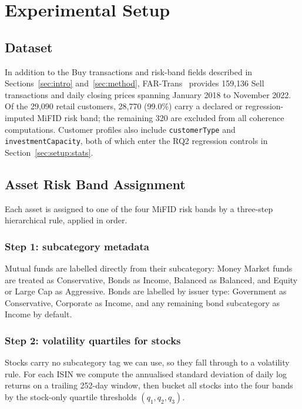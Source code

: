 \section{Experimental Setup}
\label{sec:setup}

\subsection{Dataset}
\label{sec:setup:dataset}

In addition to the Buy transactions and risk-band fields described in Sections~\ref{sec:intro} and~\ref{sec:method}, FAR-Trans~\cite{sanzcruzado:fartrans} provides 159{,}136 Sell transactions and daily closing prices spanning January 2018 to November 2022. Of the 29{,}090 retail customers, 28{,}770 (99.0\%) carry a declared or regression-imputed MiFID risk band; the remaining 320 are excluded from all coherence computations. Customer profiles also include \texttt{customerType} and \texttt{investmentCapacity}, both of which enter the RQ2 regression controls in Section~\ref{sec:setup:stats}.

\subsection{Asset Risk Band Assignment}
\label{sec:setup:bandassignment}

Each asset is assigned to one of the four MiFID risk bands by a three-step hierarchical rule, applied in order.

\subsubsection{Step 1: subcategory metadata} Mutual funds are labelled directly from their subcategory: Money Market funds are treated as Conservative, Bonds as Income, Balanced as Balanced, and Equity or Large Cap as Aggressive. Bonds are labelled by issuer type: Government as Conservative, Corporate as Income, and any remaining bond subcategory as Income by default.

\subsubsection{Step 2: volatility quartiles for stocks} Stocks carry no subcategory tag we can use, so they fall through to a volatility rule. For each ISIN we compute the annualised standard deviation of daily log returns on a trailing 252-day window, then bucket all stocks into the four bands by the stock-only quartile thresholds $(q_1, q_2, q_3)$.


